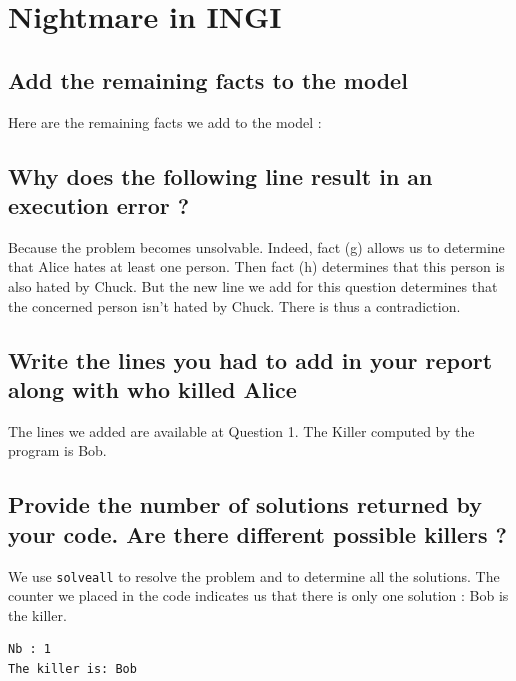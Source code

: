 \documentclass[a4paper ,12pt,french]{article}
\begin{document}
\tableofcontents %

\thispagestyle{fancy}

\pagebreak
\setcounter{page}{1}
\pagestyle{fancy} %

\section{Nightmare in INGI}
\subsection{Add the remaining facts to the model}
Here are the remaining facts we add to the model :


\subsection{Why does the following line result in an execution error ?}

Because the problem becomes unsolvable. Indeed, fact (g) allows us to determine that Alice hates at least one person. Then fact (h) determines that this person is also hated by Chuck. But the new line we add for this question determines that the concerned person isn't hated by Chuck. There is thus a contradiction.

\subsection{Write the lines you had to add in your report along with who killed Alice}

The lines we added are available at Question 1. The Killer computed by the program is Bob.

\subsection{Provide the number of solutions returned by your code. Are there different possible killers ?}

We use \texttt{solveall} to resolve the problem and to determine all the solutions. The counter we placed in the code indicates us that there is only one solution : Bob is the killer.
\begin{verbatim}
Nb : 1
The killer is: Bob 
\end{verbatim}
\end{document}
